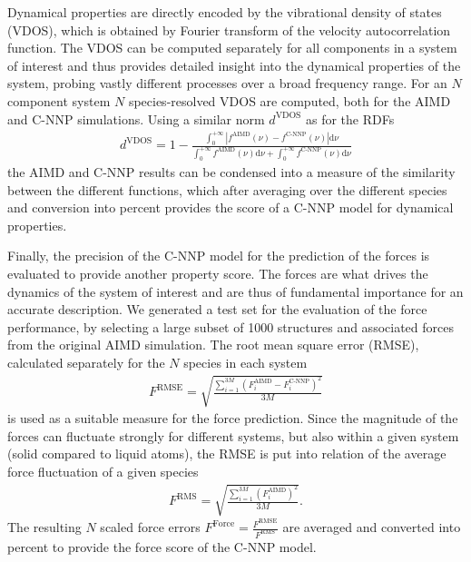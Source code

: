 \documentclass[aip,jcp,amsmath,amssymb,floatfix,reprint,citeautoscript,noeprint]{revtex4-1}
\begin{document}
\begin{bibunit}
%
Dynamical properties are directly encoded by the
vibrational density of states (VDOS), which is obtained
by Fourier transform of the velocity autocorrelation function.
%
The VDOS can be computed separately for all components in a
system of interest and thus provides detailed insight
into the dynamical properties of the system,
probing vastly different processes
over a broad frequency range.
%
For an $N$ component system $N$ species-resolved VDOS
are computed, both for the AIMD and C-NNP simulations.
%
Using a similar norm $d^\text{VDOS}$ as for the RDFs
\begin{align}
    d^\text{VDOS} = 1 - \frac{\int_{0}^{+\infty} \left| f^\text{AIMD}(\nu)-f^\text{C-NNP}(\nu)\right|\text{d}\nu}
             {\int_{0}^{+\infty}f^\text{AIMD}(\nu) \text{d}\nu + \int_{0}^{+\infty}f^\text{C-NNP}(\nu)\text{d}\nu}
\end{align}
the AIMD and C-NNP results can be condensed into a measure
of the similarity between the different functions, which
after averaging over the different species and conversion
into percent provides the score of a C-NNP model
for dynamical properties.

%
Finally, the precision of the C-NNP model for the prediction
of the forces is evaluated to provide another property score.
%
The forces are what drives the dynamics of the system of
interest and are thus of fundamental importance for an
accurate description.
%
We generated a test set for the evaluation of the force
performance, by selecting a large subset of 1000 structures
and associated forces from the original AIMD simulation.
%
The root mean square error (RMSE), calculated separately
for the $N$ species in each system
\begin{align}
    F^\text{RMSE} = \sqrt{\frac{\sum_{i=1}^{3M} \left(F^\text{AIMD}_{i} - F^\text{C-NNP}_{i}\right)^2}{3M}}
\end{align}
is used as a suitable measure for the force prediction.
%
Since the magnitude of the forces can fluctuate strongly
for different systems, but also within a given system (solid compared to
liquid atoms), the RMSE is put into relation of the average force
fluctuation of a given species
\begin{align}
    F^\text{RMS} = \sqrt{\frac{\sum_{i=1}^{3M} \left(F^\text{AIMD}_{i}\right)^2}{3M}}.
\end{align}
%
The resulting $N$ scaled force errors $F^\text{Force} = \frac{F^\text{RMSE}}{F^\text{RMS}}$
are averaged and converted into percent to provide the
force score of the C-NNP model.


\end{bibunit}
\end{document}

